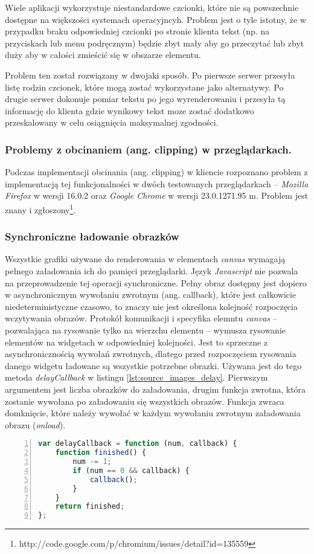 Wiele aplikacji wykorzystuje niestandardowe czcionki, które nie są powszechnie dostępne na większości systemach operacyjncyh. Problem jest o tyle istotny, że w przypadku braku odpowiedniej czcionki po stronie klienta tekst (np. na przyciskach lub menu podręcznym) będzie zbyt mały aby go przeczytać lub zbyt duży aby w całości zmieścić się w obszarze elementu. 

Problem ten został rozwiązany w dwojaki sposób. Po pierwsze serwer przesyła listę rodzin czcionek, które mogą zostać wykorzystane jako alternatywy. Po drugie serwer dokonuje pomiar tekstu po jego wyrenderowaniu i przesyła tą informację do klienta gdzie wynikowy tekst moze zostać dodatkowo przeskalowany w celu osiągnięcia maksymalnej zgodności.

\subsubsection{Problemy z obcinaniem (ang. clipping) w przeglądarkach.}
\label{problems_clipping}
Podczas implementacji obcinania (ang. clipping) w kliencie rozpoznano problem z implementacją tej funkcjonalności w dwóch testowanych przeglądarkach -- \emph{Mozilla Firefox} w wersji 16.0.2 oraz \emph{Google Chrome} w wersji 23.0.1271.95 m. Problem jest znany i zgłoszony\footnote{http://code.google.com/p/chromium/issues/detail?id=135559}.

\subsubsection{Synchroniczne ładowanie obrazków}

Wszystkie grafiki używane do renderowania w elementach \emph{canvas} wymagają pełnego załadowania ich do pamięci przeglądarki. Język \emph{Javascript} nie pozwala na przeprowadzenie tej operacji synchroniczne. Pełny obraz dostępny jest dopiero w asynchronicznym wywołaniu zwrotnym (ang. callback), które jest całkowicie niedeterministyczne czasowo, to znaczy nie jest określona kolejność rozpoczęcia wczytywania obrazów. Protokół komunikacji i specyfika elemntu \emph{canvas} -- pozwalająca na rysowanie tylko na wierzchu elementu -- wymusza rysowanie elementów na widgetach w odpowiedniej kolejności. Jest to sprzeczne z asynchronicznością wywołań zwrotnych, dlatego przed rozpoczęciem rysowania danego widgetu ładowane są wszystkie potrzebne obrazki. Używana jest do tego metoda \emph{delayCallback} w listingu \ref{lst:source_images_delay}. Pierwszym argumentem jest liczba obrazków do załadowania, drugim funkcja zwrotna, która zostanie wywołana po załadowaniu się wszystkich obrazów. Funkcja zwraca domknięcie, które należy wywołać w każdym wywołaniu zwrotnym załadowania obrazu (\emph{onload}).

\label{lst:source_images_delay}
\begin{lstlisting}[language=JavaScript,numbers=left,caption={Metoda łącząca wywołania wielu callbacków w jeden},label={lst:source_images_delay}]
var delayCallback = function (num, callback) {
    function finished() {
        num -= 1;
        if (num == 0 && callback) {
            callback();
        }
    }
    return finished;
};
\end{lstlisting}

